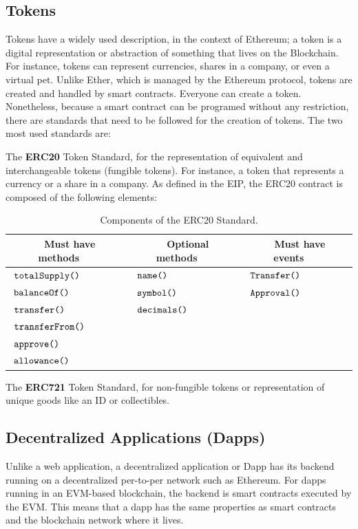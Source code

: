 \documentclass[11pt,a4paper]{report}
\begin{document}
\subsection{Tokens}\label{sec:tokens}
Tokens have a widely used description\cite{wiki:Token}, in the context of Ethereum; a token\cite{tokens} is a digital representation or abstraction of something that lives on the Blockchain. For instance, tokens can represent currencies, shares in a company, or even a virtual pet. Unlike Ether, which is managed by the Ethereum protocol, tokens are created and handled by smart contracts. Everyone can create a token. Nonetheless, because a smart contract can be programed without any restriction, there are standards that need to be followed for the creation of tokens. The two most used standards are:

The \textbf{ERC20} Token Standard\cite{erc20}, for the representation of equivalent and interchangeable tokens (fungible tokens). For instance, a token that represents a currency or a share in a company. As defined in the EIP\cite{erc20}, the ERC20 contract is composed of the following elements:
\begin{table}[htp]
	\centering
	\begin{tabular}{|l|l|l|}
		\hline
		\multicolumn{1}{|c|}{\textbf{~Must have methods~~~}} & 
		\multicolumn{1}{|c|}{\textbf{~Optional methods~~~}}  &
		\multicolumn{1}{|c|}{\textbf{~Must have events~~~}} \\\hline
		 $~\verb|totalSupply()|$& $~\verb|name()|$  & $~\verb|Transfer()|$  \\
		 $~\verb|balanceOf()|$& $~\verb|symbol()|$ & $~\verb|Approval()|$  \\
		 $~\verb|transfer()|$& $~\verb|decimals()|$  &  \\
		 $~\verb|transferFrom()|$&  &   \\
		 $~\verb|approve()|$&  &   \\
		 $~\verb|allowance()|$&  &   \\\hline		 
	\end{tabular}
	\caption{Components of the ERC20 Standard.}
	\label{tab:erc20}
\end{table}



The \textbf{ERC721} Token Standard\cite{erc721}, for non-fungible tokens or representation of unique goods like an ID or collectibles.

\subsection{Decentralized Applications (Dapps)}\label{sec:dapps}
Unlike a web application, a decentralized application or Dapp\cite{book:dapps}\cite{dapps}\cite{dapps_arch} has its backend running on a decentralized per-to-per network such as Ethereum. For dapps running in an EVM-based blockchain, the backend is smart contracts executed by the EVM. This means that a dapp has the same properties as smart contracts and the blockchain network where it lives.
\end{document}
